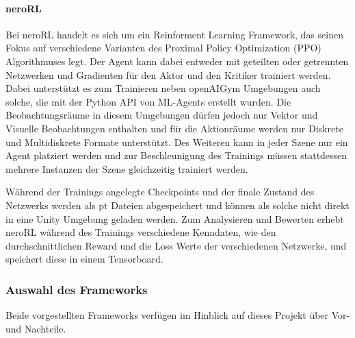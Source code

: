 \paragraph{neroRL} \label{neroRLFramework}
Bei neroRL \cite{neroRL} handelt es sich um ein Reinforment Learning Framework, das seinen Fokus auf verschiedene Varianten des Proximal Policy Optimization (PPO) Algorithmuses legt.
Der Agent kann dabei entweder mit geteilten oder getrennten Netzwerken und Gradienten für den Aktor und den Kritiker trainiert werden.
Dabei unterstützt es zum Trainieren neben openAIGym Umgebungen auch solche, die mit der Python API von ML-Agents erstellt wurden.
Die Beobachtungsräume in diesem Umgebungen dürfen jedoch nur Vektor und Visuelle Beobachtungen enthalten und für die Aktionräume werden nur Diskrete und Multidiskrete Formate unterstützt.
Des Weiteren kann in jeder Szene nur ein Agent platziert werden und zur Beschleunigung des Trainings müssen stattdessen mehrere Instanzen der Szene gleichzeitig trainiert werden.

Während der Trainings angelegte Checkpoints und der finale Zustand des Netzwerks werden als pt Dateien abgespeichert und können als solche nicht direkt in eine Unity Umgebung geladen werden.
Zum Analysieren und Bewerten erhebt neroRL während des Trainings verschiedene Kenndaten, wie den durchschnittlichen Reward und die Loss Werte der verschiedenen Netzwerke, und speichert diese in einem Tensorboard.

\subsubsection{Auswahl des Frameworks}

Beide vorgestellten Frameworks verfügen im Hinblick auf dieses Projekt über Vor- und Nachteile.

